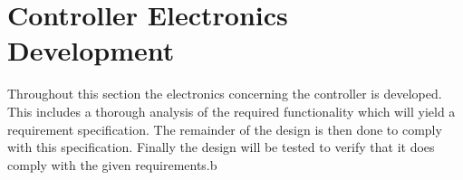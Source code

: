 \section{Controller Electronics Development}
\label{sec:controller_board}
Throughout this section the electronics concerning the controller is developed.
This includes a thorough analysis of the required functionality which will yield a requirement specification.
The remainder of the design is then done to comply with this specification.
Finally the design will be tested to verify that it does comply with the given requirements.b
%
%
%
%